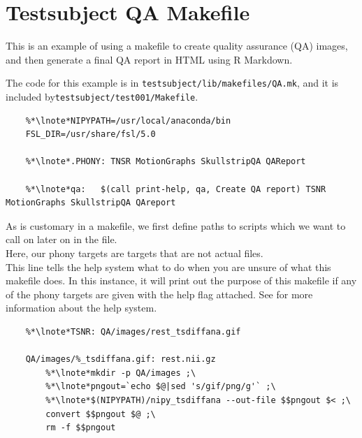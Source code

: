 \section{Testsubject QA Makefile}
\label{example:testsubjectQA}

This is an example of using a makefile to create quality assurance (QA) images, and then generate a final QA report in HTML using R Markdown. 

The code for this example is in \texttt{testsubject/lib/makefiles/QA.mk}, and it is included by\linebreak \texttt{testsubject/test001/Makefile}.

\setcounter{codehighlight}{0} %
\begin{lstlisting}
	%*\lnote*NIPYPATH=/usr/local/anaconda/bin
	FSL_DIR=/usr/share/fsl/5.0

	%*\lnote*.PHONY: TNSR MotionGraphs SkullstripQA QAReport

	%*\lnote*qa:   $(call print-help, qa, Create QA report) TSNR MotionGraphs SkullstripQA QAreport
\end{lstlisting}

\noindent{} As is customary in a makefile, we first define paths to scripts which we want to call on later on in the file. \\
 Here, our phony targets are targets that are not actual files.\\
 This line tells the \maken{} help system what to do when you are unsure of what this makefile does. In this instance, it will print out the purpose of this makefile if any of the phony targets are given with the help flag attached. See  for more information about the help system. \\

\begin{lstlisting}
	%*\lnote*TSNR: QA/images/rest_tsdiffana.gif

	QA/images/%_tsdiffana.gif: rest.nii.gz
		%*\lnote*mkdir -p QA/images ;\
		%*\lnote*pngout=`echo $@|sed 's/gif/png/g'` ;\
		%*\lnote*$(NIPYPATH)/nipy_tsdiffana --out-file $$pngout $< ;\
		convert $$pngout $@ ;\
		rm -f $$pngout
\end{lstlisting}

